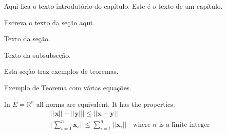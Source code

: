 %
%
%
%





  Aqui fica o texto introdutório do capítulo.
  Este é o texto de um capítulo.

 
        Escreva o texto da seção aqui. 
    
    
                
                Texto da seção.
        

                    Texto da subsubseção.




        Esta seção traz exemplos de teoremas.


            Exemplo de Teorema com várias equações.

            \begin{theorem}
                In $E=\mathbb{R}^n$ all norms are equivalent. It has the properties:
                \begin{align}
                    & \big| ||\mathbf{x}|| - ||\mathbf{y}|| \big|\leq || \mathbf{x}- \mathbf{y}||\\
                    &  ||\sum_{i=1}^n\mathbf{x}_i||\leq \sum_{i=1}^n||\mathbf{x}_i||\quad\text{where $n$ is a finite integer}
                \end{align}
            \end{theorem}

